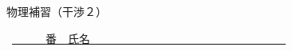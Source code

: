 \documentclass[a4paper,9pt]{jsarticle}
\begin{document}
\hakosyokika
\begin{center}
{\Large 物理補習（干渉２）}
\end{center}
\hfill ~\underline{~~~~~~番　氏名~~~~~~~~~~~~~~~~~~~~~~~~~~~~~~~~~~~}
\hakosyokika

\begin{enumerate}
% 
%  
%  
%  
%  
%  
%  
%  
%  
%  
%  
%  
%  
 
 \vfill
 
 \vfill
\end{enumerate}
\end{document}
